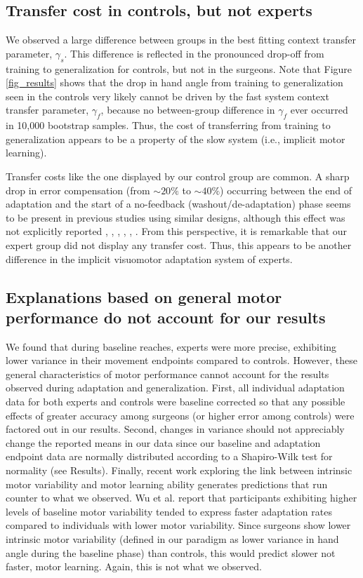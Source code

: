\documentclass[man, 11pt, longtable, floatsintext, notab]{apa6}
\begin{document}
\subsection{Transfer cost in controls, but not experts}
We observed a large difference between groups in the best
fitting context transfer parameter, $\gamma_s$. This
difference is reflected in the pronounced drop-off from
training to generalization for controls, but not in the
surgeons. Note that Figure \ref{fig_results} shows that the
drop in hand angle from training to generalization seen in
the controls very likely cannot be driven by the fast system
context transfer parameter, $\gamma_f$, because no
between-group difference in $\gamma_f$ ever occurred in 10,000
bootstrap samples. Thus, the cost of transferring from
training to generalization appears to be a property of the
slow system (i.e., implicit motor learning).

Transfer costs like the one displayed by our control group
are common. A sharp drop in error compensation (from $\sim20\%$ to
$\sim40\%$)  occurring between the
end of adaptation and the start of a no-feedback
(washout/de-adaptation) phase seems to be present in previous studies using similar designs, although this effect was not explicitly reported
\cite{sternad_motor_2009},
\cite{mazzoni_implicit_2006},
\cite{sadnicka_normal_2014}, \cite{haar_dissociating_2015},
\cite{jalali_neural_2018},
\cite{nakagawa-silva_framework_2018}. From this
perspective, it is remarkable that our expert group did not
display any transfer cost. Thus, this appears to be another
difference in the implicit visuomotor adaptation system of
experts.

\subsection{Explanations based on general motor performance do not account for our results}
We found that during baseline reaches, experts were more
precise, exhibiting lower variance in their movement
endpoints compared to controls. However, these general
characteristics of motor performance cannot account for the
results observed during adaptation and generalization.
First, all individual adaptation data for both experts and
controls were baseline corrected so that any possible
effects of greater accuracy among surgeons (or higher error
among controls) were factored out in our results. Second,
changes in variance should not appreciably change the
reported means in our data since our baseline and adaptation
endpoint data are normally distributed according to a
Shapiro-Wilk test for normality (see Results). Finally,
recent work exploring the link between intrinsic motor
variability and motor learning ability
\cite{anguera_failure_2011} generates predictions that run
counter to what we observed. Wu et al.
\cite{wu_temporal_2014} report that participants exhibiting
higher levels of baseline motor variability tended to
express faster adaptation rates compared to individuals with
lower motor variability. Since surgeons show lower intrinsic
motor variability (defined in our paradigm as lower variance
in hand angle during the baseline phase) than controls, this
would predict slower not faster, motor learning. Again, this
is not what we observed.
\end{document}
